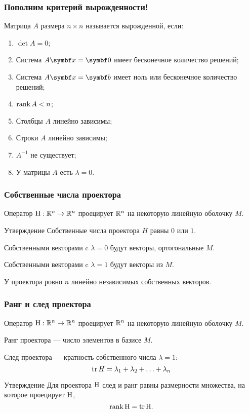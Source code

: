 \begin{frame}
    \frametitle{Пополним критерий вырожденности!}

    Матрица $A$ размера $n\times n$ называется \alert{вырожденной}, если:

    \begin{enumerate}
        \item $\det A = 0$; 
        \item Система $A \bx = \bzero$ имеет бесконечное количество решений; 
        \item Система $A \bx = \bb$ имеет ноль или бесконечное количество решений; 
        \item $\rank A < n$; 
        \item Столбцы $A$ линейно зависимы; 
        \item Строки $A$ линейно зависимы; 
        \item $A^{-1}$ не существует; 
        \item \alert{У матрицы $A$ есть $\lambda=0$.}
    \end{enumerate}


\end{frame}



\begin{frame}
    \frametitle{Собственные числа проектора}

    Оператор $\mathrm{H}: \mathbb{R}^n \to \mathbb{R}^n$ проецирует $\mathbb{R}^n$ на некоторую линейную оболочку $M$. \pause
    
    \begin{block}{Утверждение}
        Собственные числа проектора $H$ равны $0$ или $1$. \pause
        
        Собственными векторами c $\lambda=0$ будут векторы, ортогональные $M$. \pause

        Собственными векторами c $\lambda=1$ будут векторы из  $M$. \pause

        У проектора ровно $n$ линейно независимых собственных векторов. 
    \end{block}

    

\end{frame}


\begin{frame}
\frametitle{Ранг и след проектора}

Оператор $\mathrm{H}: \mathbb{R}^n \to \mathbb{R}^n$ проецирует $\mathbb{R}^n$ на некоторую линейную оболочку $M$. \pause

    Ранг проектора — число элементов в базисе $M$. \pause

    След проектора — кратность собственного числа $\lambda=1$:
    \[
    \trace H = \lambda_1 + \lambda_2 + \ldots + \lambda_n    
    \]
    \pause

    \begin{block}{Утверждение}
        Для проектора $\mathrm{H}$ след и ранг равны размерности множества, на которое проецирует $\mathrm{H}$,
        \[
        \rank \HH = \trace \HH.    
        \]
    \end{block}


\end{frame}